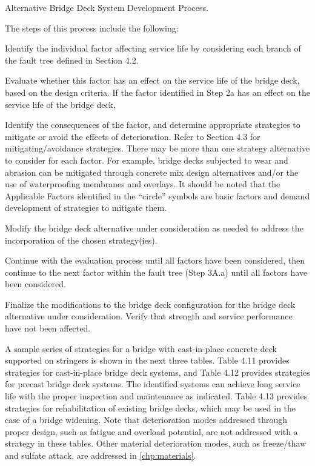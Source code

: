 \begin{table}
  \caption{Alternative Bridge Deck System Development Process.}
  \label{tab:alternative-deck-development}
\end{table}

The steps of this process include the following:
\begin{description}[style=nextline,leftmargin=6em]
  \item[Step 1A.] Identify the individual factor affecting service life by considering each branch of the fault tree defined in Section 4.2.
  \item[Step 2A.]Evaluate whether this factor has an effect on the service life of the bridge deck, based on the design
  criteria. If the factor identified in Step 2a has an effect on the service life of the bridge deck,
  \item[Step 2A.a.] Identify the consequences of the factor, and determine appropriate strategies to mitigate or avoid the
  effects of deterioration. Refer to Section 4.3 for mitigating/avoidance strategies. There may be more
  than one strategy alternative to consider for each factor. For example, bridge decks subjected to
  wear and abrasion can be mitigated through concrete mix design alternatives and/or the use of
  waterproofing membranes and overlays. It should be noted that the Applicable Factors identified in
  the “circle” symbols are basic factors and demand development of strategies to mitigate them.
  \item[Step 2A.b.] Modify the bridge deck alternative under consideration as needed to address the incorporation of the
  chosen strategy(ies).
  \item[Step 3A:]Continue with the evaluation process until all factors have been considered, then continue to the next
  factor within the fault tree (Step 3A.a) until all factors have been considered.
  \item[Step 4A:] Finalize the modifications to the bridge deck configuration for the bridge deck alternative under
  consideration. Verify that strength and service performance have not been affected.
\end{description}

A sample series of strategies for a bridge with cast-in-place concrete deck supported on stringers is shown in the
next three tables. Table 4.11 provides strategies for cast-in-place bridge deck systems, and Table 4.12 provides
strategies for precast bridge deck systems. The identified systems can achieve long service life with the proper
inspection and maintenance as indicated. Table 4.13 provides strategies for rehabilitation of existing bridge decks,
which may be used in the case of a bridge widening. Note that deterioration modes addressed through proper design,
such as fatigue and overload potential, are not addressed with a strategy in these tables. Other material deterioration
modes, such as freeze/thaw and sulfate attack, are addressed in \cref{chp:materials}.

